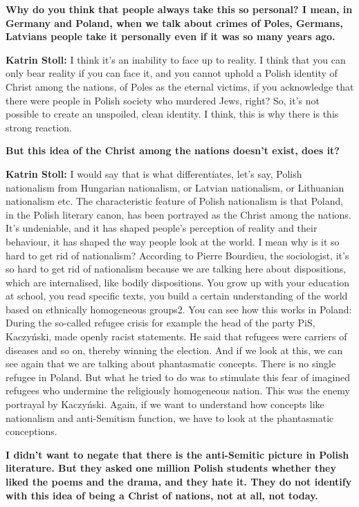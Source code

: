 \textbf{Why do you think that people always take this so personal? I mean, in Germany and Poland, when we talk about crimes of Poles, Germans, Latvians people take it personally even if it was so many years ago.}

\textbf{Katrin Stoll:} I think it’s an inability to face up to reality. I think that you can only bear reality if you can face it, and you cannot uphold a Polish identity of Christ among the nations, of Poles as the eternal victims, if you acknowledge that there were people in Polish society who murdered Jews, right? So, it’s not possible to create an unspoiled, clean identity. I think, this is why there is this strong reaction.  

\textbf{But this idea of the Christ among the nations doesn’t exist, does it?} 

\textbf{Katrin Stoll:} I would say that is what differentiates, let’s say, Polish nationalism from Hungarian nationalism, or Latvian nationalism, or Lithuanian nationalism etc. The characteristic feature of Polish nationalism is that Poland, in the Polish literary canon, has been portrayed as the Christ among the nations. It’s undeniable, and it has shaped people’s perception of reality and their behaviour, it has shaped the way people look at the world. I mean why is it so hard to get rid of nationalism? According to Pierre Bourdieu, the sociologist, it’s so hard to get rid of nationalism because we are talking here about dispositions, which are internalised, like bodily dispositions. You grow up with your education at school, you read specific texts, you build a certain understanding of the world based on ethnically homogeneous groups2. You can see how this works in Poland: During the so-called refugee crisis for example the head of the party PiS, Kaczyński, made openly racist statements. He said that refugees were carriers of diseases and so on, thereby winning the election. And if we look at this, we can see again that we are talking about phantasmatic concepts. There is no single refugee in Poland. But what he tried to do was to stimulate this fear of imagined refugees who undermine the religiously homogeneous nation. This was the enemy portrayal by Kaczyński. Again, if we want to understand how concepts like nationalism and anti-Semitism function, we have to look at the phantasmatic conceptions. 

\textbf{I didn’t want to negate that there is the anti-Semitic picture in Polish literature. But they asked one million Polish students whether they liked the poems and the drama, and they hate it. They do not identify with this idea of being a Christ of nations, not at all, not today.} 

